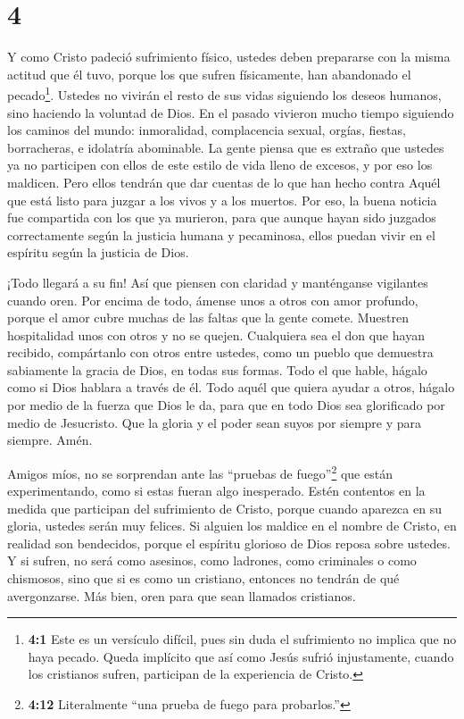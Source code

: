 \hypertarget{section-3}{%
\section{4}\label{section-3}}

 Y como Cristo padeció sufrimiento físico, ustedes deben
prepararse con la misma actitud que él tuvo, porque los que sufren
físicamente, han abandonado el pecado\footnote{\textbf{4:1} Este es un
  versículo difícil, pues sin duda el sufrimiento no implica que no haya
  pecado. Queda implícito que así como Jesús sufrió injustamente, cuando
  los cristianos sufren, participan de la experiencia de Cristo.}.
 Ustedes no vivirán el resto de sus vidas siguiendo los
deseos humanos, sino haciendo la voluntad de Dios.  En el
pasado vivieron mucho tiempo siguiendo los caminos del mundo:
inmoralidad, complacencia sexual, orgías, fiestas, borracheras, e
idolatría abominable.  La gente piensa que es extraño que
ustedes ya no participen con ellos de este estilo de vida lleno de
excesos, y por eso los maldicen. Pero ellos tendrán que dar cuentas de
lo que han hecho contra Aquél que está listo para juzgar a los vivos y a
los muertos.  Por eso, la buena noticia fue compartida con
los que ya murieron,  para que aunque hayan sido juzgados
correctamente según la justicia humana y pecaminosa, ellos puedan vivir
en el espíritu según la justicia de Dios.

 ¡Todo llegará a su fin! Así que piensen con claridad y
manténganse vigilantes cuando oren.  Por encima de todo,
ámense unos a otros con amor profundo, porque el amor cubre muchas de
las faltas que la gente comete.  Muestren hospitalidad unos
con otros y no se quejen.  Cualquiera sea el don que hayan
recibido, compártanlo con otros entre ustedes, como un pueblo que
demuestra sabiamente la gracia de Dios, en todas sus formas.
 Todo el que hable, hágalo como si Dios hablara a través de
él. Todo aquél que quiera ayudar a otros, hágalo por medio de la fuerza
que Dios le da, para que en todo Dios sea glorificado por medio de
Jesucristo. Que la gloria y el poder sean suyos por siempre y para
siempre. Amén.

 Amigos míos, no se sorprendan ante las ``pruebas de
fuego''\footnote{\textbf{4:12} Literalmente ``una prueba de fuego para
  probarlos.''} que están experimentando, como si estas fueran algo
inesperado.  Estén contentos en la medida que participan
del sufrimiento de Cristo, porque cuando aparezca en su gloria, ustedes
serán muy felices.  Si alguien los maldice en el nombre de
Cristo, en realidad son bendecidos, porque el espíritu glorioso de Dios
reposa sobre ustedes.  Y si sufren, no será como asesinos,
como ladrones, como criminales o como chismosos,  sino que
si es como un cristiano, entonces no tendrán de qué avergonzarse. Más
bien, oren para que sean llamados cristianos.

